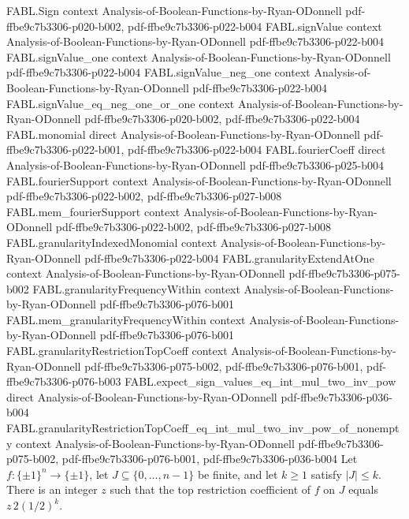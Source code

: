 \begin{theorem}
\label{FABL.granularityRestrictionTopCoeff_eq_int_mul_global_scale}
\leanok
{}
\proofstep
  {FABL.Sign}
  {context}
  {Analysis-of-Boolean-Functions-by-Ryan-ODonnell}
  {pdf-ffbe9c7b3306-p020-b002,
    pdf-ffbe9c7b3306-p022-b004}
\proofstep
  {FABL.signValue}
  {context}
  {Analysis-of-Boolean-Functions-by-Ryan-ODonnell}
  {pdf-ffbe9c7b3306-p022-b004}
\proofstep
  {FABL.signValue_one}
  {context}
  {Analysis-of-Boolean-Functions-by-Ryan-ODonnell}
  {pdf-ffbe9c7b3306-p022-b004}
\proofstep
  {FABL.signValue_neg_one}
  {context}
  {Analysis-of-Boolean-Functions-by-Ryan-ODonnell}
  {pdf-ffbe9c7b3306-p022-b004}
\proofstep
  {FABL.signValue_eq_neg_one_or_one}
  {context}
  {Analysis-of-Boolean-Functions-by-Ryan-ODonnell}
  {pdf-ffbe9c7b3306-p020-b002,
    pdf-ffbe9c7b3306-p022-b004}
\proofstep
  {FABL.monomial}
  {direct}
  {Analysis-of-Boolean-Functions-by-Ryan-ODonnell}
  {pdf-ffbe9c7b3306-p022-b001,
    pdf-ffbe9c7b3306-p022-b004}
\proofstep
  {FABL.fourierCoeff}
  {direct}
  {Analysis-of-Boolean-Functions-by-Ryan-ODonnell}
  {pdf-ffbe9c7b3306-p025-b004}
\proofstep
  {FABL.fourierSupport}
  {context}
  {Analysis-of-Boolean-Functions-by-Ryan-ODonnell}
  {pdf-ffbe9c7b3306-p022-b002,
    pdf-ffbe9c7b3306-p027-b008}
\proofstep
  {FABL.mem_fourierSupport}
  {context}
  {Analysis-of-Boolean-Functions-by-Ryan-ODonnell}
  {pdf-ffbe9c7b3306-p022-b002,
    pdf-ffbe9c7b3306-p027-b008}
\proofstep
  {FABL.granularityIndexedMonomial}
  {context}
  {Analysis-of-Boolean-Functions-by-Ryan-ODonnell}
  {pdf-ffbe9c7b3306-p022-b004}
\proofstep
  {FABL.granularityExtendAtOne}
  {context}
  {Analysis-of-Boolean-Functions-by-Ryan-ODonnell}
  {pdf-ffbe9c7b3306-p075-b002}
\proofstep
  {FABL.granularityFrequencyWithin}
  {context}
  {Analysis-of-Boolean-Functions-by-Ryan-ODonnell}
  {pdf-ffbe9c7b3306-p076-b001}
\proofstep
  {FABL.mem_granularityFrequencyWithin}
  {context}
  {Analysis-of-Boolean-Functions-by-Ryan-ODonnell}
  {pdf-ffbe9c7b3306-p076-b001}
\proofstep
  {FABL.granularityRestrictionTopCoeff}
  {context}
  {Analysis-of-Boolean-Functions-by-Ryan-ODonnell}
  {pdf-ffbe9c7b3306-p075-b002,
    pdf-ffbe9c7b3306-p076-b001,
    pdf-ffbe9c7b3306-p076-b003}
\proofstep
  {FABL.expect_sign_values_eq_int_mul_two_inv_pow}
  {direct}
  {Analysis-of-Boolean-Functions-by-Ryan-ODonnell}
  {pdf-ffbe9c7b3306-p036-b004}
\proofstep
  {FABL.granularityRestrictionTopCoeff_eq_int_mul_two_inv_pow_of_nonempty}
  {context}
  {Analysis-of-Boolean-Functions-by-Ryan-ODonnell}
  {pdf-ffbe9c7b3306-p075-b002,
    pdf-ffbe9c7b3306-p076-b001,
    pdf-ffbe9c7b3306-p036-b004}
Let $f:\{\pm1\}^n\to\{\pm1\}$, let $J\subseteq\{0,\ldots,n-1\}$ be finite, and let
$k\ge1$ satisfy $|J|\le k$. There is an integer $z$ such that the top restriction
coefficient of $f$ on $J$ equals $z\,2(1/2)^k$.
\end{theorem}

